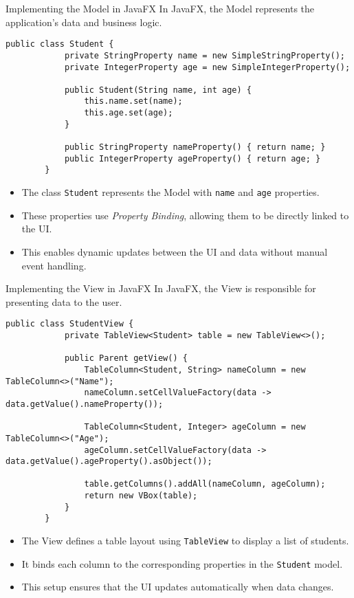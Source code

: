 \documentclass[aspectratio=169, table]{beamer}
\begin{document}
\begin{frame}[fragile]{Implementing the Model in JavaFX}
	\vspace{20pt}
	In JavaFX, the Model represents the application's data and business logic.  
	
	\begin{lstlisting}[style=JavaStyle]
		public class Student {
			private StringProperty name = new SimpleStringProperty();
			private IntegerProperty age = new SimpleIntegerProperty();
			
			public Student(String name, int age) {
				this.name.set(name);
				this.age.set(age);
			}
			
			public StringProperty nameProperty() { return name; }
			public IntegerProperty ageProperty() { return age; }
		}
	\end{lstlisting}
	
	\begin{itemize}
		\item The class \texttt{Student} represents the Model with \texttt{name} and \texttt{age} properties.
		\item These properties use \textit{Property Binding}, allowing them to be directly linked to the UI.
		\item This enables dynamic updates between the UI and data without manual event handling.
	\end{itemize}
\end{frame}

\begin{frame}[fragile]{Implementing the View in JavaFX}
	\vspace{20pt}
	In JavaFX, the View is responsible for presenting data to the user.  
	
	\begin{lstlisting}[style=JavaStyle]
		public class StudentView {
			private TableView<Student> table = new TableView<>();
			
			public Parent getView() {
				TableColumn<Student, String> nameColumn = new TableColumn<>("Name");
				nameColumn.setCellValueFactory(data -> data.getValue().nameProperty());
				
				TableColumn<Student, Integer> ageColumn = new TableColumn<>("Age");
				ageColumn.setCellValueFactory(data -> data.getValue().ageProperty().asObject());
				
				table.getColumns().addAll(nameColumn, ageColumn);
				return new VBox(table);
			}
		}
	\end{lstlisting}
	
	\begin{itemize}
		\item The View defines a table layout using \texttt{TableView} to display a list of students.
		\item It binds each column to the corresponding properties in the \texttt{Student} model.
		\item This setup ensures that the UI updates automatically when data changes.
	\end{itemize}
\end{frame}
\end{document}
